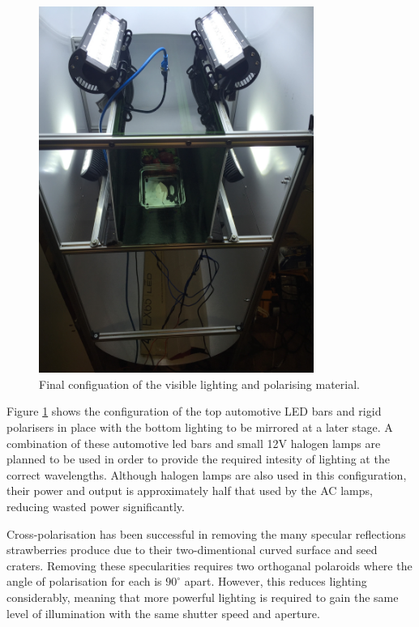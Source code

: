 \documentclass[fleqn,twoside,12pt]{report}
\begin{document}
\begin{figure}[h!]
	\centering
	\includegraphics[width=0.8\textwidth,angle=270]{bench_led_rigid.jpg}
	\caption{Final configuation of the visible lighting and polarising material.}
	\label{fig:final_led}
\end{figure} 

Figure \ref{fig:final_led} shows the configuration of the top automotive LED bars and rigid polarisers in place with the bottom lighting to be mirrored at a later stage. A combination of these automotive led bars and small 12V halogen lamps are planned to be used in order to provide the required intesity of lighting at the correct wavelengths. Although halogen lamps are also used in this configuration, their power and output is approximately half that used by the AC lamps, reducing wasted power significantly.  


Cross-polarisation has been successful in removing the many specular reflections strawberries produce due to their two-dimentional curved surface and seed craters. Removing these specularities requires two orthoganal polaroids where the angle of polarisation for each is $90^{\circ}$ apart. However, this reduces lighting considerably, meaning that more powerful lighting is required to gain the same level of illumination with the same shutter speed and aperture.
\end{document}
